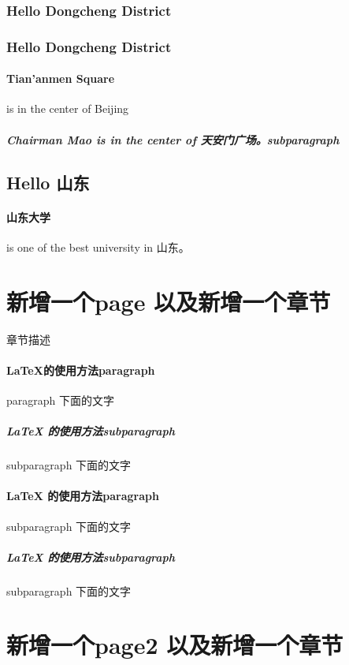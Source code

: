 \documentclass[UTF8]{ctexart}
\begin{document}
\subsubsection{Hello Dongcheng District}
\subsubsection{Hello Dongcheng District}

\paragraph{Tian'anmen Square}

is in the center of Beijing
\subparagraph{Chairman Mao    is in the center of 天安门广场。subparagraph}



\subsection{Hello 山东}
\paragraph{山东大学} is one of the best university in 山东。


\newpage

\section{新增一个page 以及新增一个章节}
章节描述
\paragraph{\LaTeX{}的使用方法paragraph}

paragraph 下面的文字
\subparagraph{\LaTeX{} 的使用方法subparagraph}
subparagraph 下面的文字
\paragraph{\LaTeX{} 的使用方法paragraph}
subparagraph 下面的文字
\subparagraph{\LaTeX{} 的使用方法subparagraph}
subparagraph 下面的文字

\section{新增一个page2 以及新增一个章节}

\begin{lstlisting}[language=xml]



\end{lstlisting}
\end{document}
